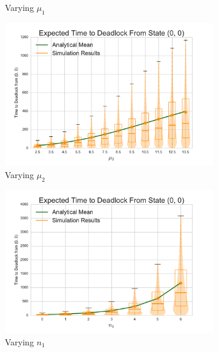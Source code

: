 \documentclass{article}
\begin{document}
\begin{center}
\begin{figure}[!htbp]
\begin{center}
\begin{subfigure}[b]{0.38\textwidth}
  \caption{Varying $\mu_1$}
  \label{fig:timestodeadlock2_mu1}
\end{subfigure}
\begin{subfigure}[b]{0.38\textwidth}
  \includegraphics[width=\textwidth]{images/varymu2}
  \caption{Varying $\mu_2$}
  \label{fig:timestodeadlock2_mu2}
\end{subfigure}
\begin{subfigure}[b]{0.38\textwidth}
  \includegraphics[width=\textwidth]{images/varyn1}
  \caption{Varying $n_1$}
  \label{fig:timestodeadlock2_n1}
\end{subfigure}
\begin{subfigure}[b]{0.38\textwidth}

\end{subfigure}
\end{center}
\end{figure}
\end{center}
\end{document}
